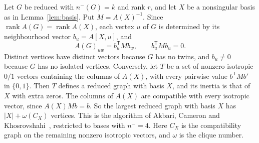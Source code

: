 \documentclass[11pt]{amsart}
\theoremstyle{definition}
\theoremstyle{remark}
\newcommand{\rk}{\operatorname{rank}}
\begin{document}
Let $G$ be reduced with $n^-(G)=k$ and rank $r$, and let $X$ be a nonsingular basis as in Lemma~\ref{lem:basis}. Put $M=A(X)^{-1}$. Since $\rk A(G)=\rk A(X)$, each vertex $u$ of $G$ is determined by its neighbourhood vector $b_u=A[X,u]$, and
\[
A(G)_{uw}=b_u^{\mathsf T}Mb_w,\qquad b_u^{\mathsf T}Mb_u=0 .
\]
Distinct vertices have distinct vectors because $G$ has no twins, and $b_u\ne0$ because $G$ has no isolated vertices. Conversely, let $T$ be a set of nonzero isotropic $0/1$ vectors containing the columns of $A(X)$, with every pairwise value $b^{\mathsf T}Mb'$ in $\{0,1\}$. Then $T$ defines a reduced graph with basis $X$, and its inertia is that of $X$ with extra zeros. The columns of $A(X)$ are compatible with every isotropic vector, since $A(X)Mb=b$. So the largest reduced graph with basis $X$ has $|X|+\omega(C_X)$ vertices. This is the algorithm of Akbari, Cameron and Khosrovshahi~\cite[\S3]{ACK2004}, restricted to bases with $n^-=4$. Here $C_X$ is the compatibility graph on the remaining nonzero isotropic vectors, and $\omega$ is the clique number.
\end{document}
